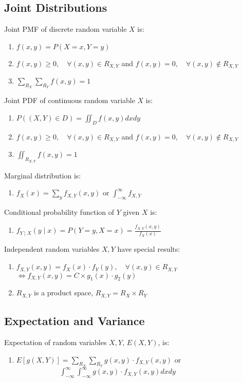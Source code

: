 \documentclass[12pt, a4paper]{article}
\begin{document}
\begin{multicols*}{3}
\section{Joint Distributions}
Joint PMF of discrete random variable $X$ is:
\begin{enumerate}[\roman*.]
  \item $f(x,y) = P(X=x, Y=y)$
  \item $f(x, y) \geq 0,\quad\forall (x, y)\in R_{X,Y}$ and $f(x,y) = 0,\quad\forall (x,y) \not\in R_{X,Y}$
  \item $\sum_{R_X}\sum_{R_Y} f(x,y) = 1$
\end{enumerate}

Joint PDF of continuous random variable $X$ is:
\begin{enumerate}[\roman*.]
  \item $P((X, Y) \in D) = \iint_D f(x, y) dxdy$
  \item $f(x, y) \geq 0,\quad\forall (x, y)\in R_{X,Y}$ and $f(x,y) = 0,\quad\forall (x,y) \not\in R_{X,Y}$
  \item $\iint_{R_{X, Y}} f(x,y) = 1$
\end{enumerate}

Marginal distribution is:
\begin{enumerate}[\roman*.]
  \item $f_X(x) = \sum_y f_{X, Y}(x,y)$ or $\int^{\infty}_{-\infty}f_{X,Y}$
\end{enumerate}

Conditional probability function of $Y$ given $X$ is:
\begin{enumerate}[\roman*.]
  \item $f_{Y\mid X}(y\mid x) = P(Y=y, X=x) = \displaystyle\frac{f_{X, Y}(x, y)}{f_X(x)}$
\end{enumerate}

Independent random variables $X, Y$ have special results:
\begin{enumerate}[\roman*.]
  \item $f_{X,Y}(x,y) = f_X(x)\cdot f_Y(y),\quad\forall (x,y) \in R_{X, Y}$\\$\iff f_{X,Y}(x,y)=C\times g_1(x) \cdot g_2(y)$
  \item $R_{X, Y}$ is a product space, $R_{X, Y} = R_X \times R_Y $
\end{enumerate}

\subsection{Expectation and Variance}
Expectation of random variables $X, Y$, $E(X, Y)$, is:
\begin{enumerate}[\roman*.]
  \item $E[g(X, Y)] = \sum_{R_X}\sum_{R_Y} g(x, y)\cdot f_{X, Y}(x, y)$ or\\$\quad\quad\quad\quad\quad\quad\int^{\infty}_{-\infty}\int^{\infty}_{-\infty}g(x, y)\cdot f_{X, Y}(x, y) dxdy$
\end{enumerate}


\end{multicols*}
\end{document}
